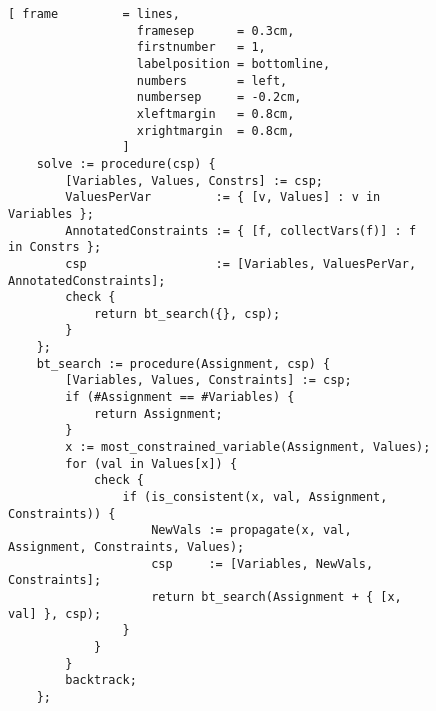 \begin{figure}[!ht]
\centering
\begin{Verbatim}[ frame         = lines, 
                  framesep      = 0.3cm, 
                  firstnumber   = 1,
                  labelposition = bottomline,
                  numbers       = left,
                  numbersep     = -0.2cm,
                  xleftmargin   = 0.8cm,
                  xrightmargin  = 0.8cm,
                ]
    solve := procedure(csp) {
        [Variables, Values, Constrs] := csp;
        ValuesPerVar         := { [v, Values] : v in Variables };
        AnnotatedConstraints := { [f, collectVars(f)] : f in Constrs };
        csp                  := [Variables, ValuesPerVar, AnnotatedConstraints];
        check {
            return bt_search({}, csp);
        }
    };
    bt_search := procedure(Assignment, csp) {
        [Variables, Values, Constraints] := csp;
        if (#Assignment == #Variables) {
            return Assignment;
        }
        x := most_constrained_variable(Assignment, Values);
        for (val in Values[x]) {
            check {
                if (is_consistent(x, val, Assignment, Constraints)) {
                    NewVals := propagate(x, val, Assignment, Constraints, Values);
                    csp     := [Variables, NewVals, Constraints];
                    return bt_search(Assignment + { [x, val] }, csp);
                }
            }
        }
        backtrack;
    };
\end{Verbatim}
\vspace*{-0.3cm}
\caption{}
\label{fig:csp-constraint-propagation.stlx-1}
\end{figure}

